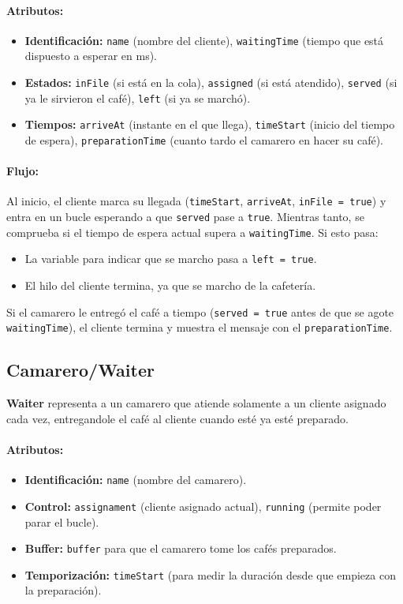 \documentclass[a4paper,12pt]{report}
\begin{document}
\paragraph{Atributos:}
\begin{itemize}
  \item \textbf{Identificación:} \texttt{name} (nombre del cliente), \texttt{waitingTime} (tiempo que está dispuesto a esperar en ms).
  \item \textbf{Estados:} \texttt{inFile} (si está en la cola), \texttt{assigned} (si está atendido), \texttt{served} (si ya le sirvieron el café), \texttt{left} (si ya se marchó).
  \item \textbf{Tiempos:} \texttt{arriveAt} (instante en el que llega), \texttt{timeStart} (inicio del tiempo de espera), \texttt{preparationTime} (cuanto tardo el camarero en hacer su café).
\end{itemize}

\paragraph{Flujo:}
Al inicio, el cliente marca su llegada (\texttt{timeStart}, \texttt{arriveAt}, \texttt{inFile = true}) y entra en un bucle esperando a que \texttt{served} pase a \texttt{true}. Mientras tanto, se comprueba si el tiempo de espera actual supera a \texttt{waitingTime}. Si esto pasa:
\begin{itemize}
  \item La variable para indicar que se marcho pasa a \texttt{left = true}.
  \item El hilo del cliente termina, ya que se marcho de la cafetería.
\end{itemize}

\noindent Si el camarero le entregó el café a tiempo (\texttt{served = true} antes de que se agote \texttt{waitingTime}), el cliente termina y muestra el mensaje con el \texttt{preparationTime}.

\vspace{1em}
\subsection*{Camarero/Waiter}
\noindent \textbf{Waiter} representa a un camarero que atiende solamente a un cliente asignado cada vez, entregandole el café al cliente cuando esté ya esté preparado.

\paragraph{Atributos:}
\begin{itemize}
  \item \textbf{Identificación:} \texttt{name} (nombre del camarero).
  \item \textbf{Control:} \texttt{assignament} (cliente asignado actual), \texttt{running} (permite poder parar el bucle).
  \item \textbf{Buffer:} \texttt{buffer} para que el camarero tome los cafés preparados.
  \item \textbf{Temporización:} \texttt{timeStart} (para medir la duración desde que empieza con la preparación).
\end{itemize}
\end{document}
